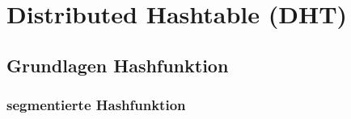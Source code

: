 \chapter{Distributed Hashtable (DHT)}
\label{chap:dht}

\section{Grundlagen Hashfunktion}
\subsection{segmentierte Hashfunktion}
